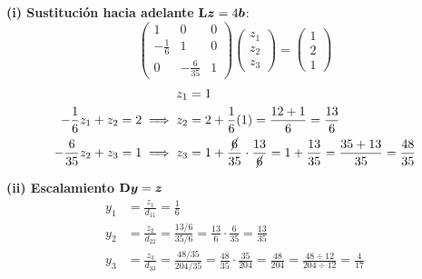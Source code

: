 \textbf{(i) Sustitución hacia adelante} $\mathbf{L}\bm{z} = 4\bm{b}$:
\[
  \begin{pmatrix} 1 & 0 & 0\\ -\frac16 & 1 & 0\\ 0 & -\frac{6}{35} & 1 \end{pmatrix}
  \begin{pmatrix} z_1\\ z_2\\ z_3 \end{pmatrix} = \begin{pmatrix} 1\\ 2\\ 1 \end{pmatrix}
\]
\begin{align*}
  z_1 &= 1\\
  -\frac16 z_1 + z_2 = 2 \;\Longrightarrow\; z_2 &= 2 + \frac16(1) = \frac{12 + 1}{6} = \frac{13}{6}\\
  -\frac{6}{35} z_2 + z_3 = 1 \;\Longrightarrow\; z_3 &= 1 + \frac{\cancel{6}}{35}\cdot\frac{13}{\cancel{6}}
     = 1 + \frac{13}{35} = \frac{35 + 13}{35} = \frac{48}{35}
\end{align*}

\textbf{(ii) Escalamiento} $\mathbf{D}\bm{y} = \bm{z}$
\begin{align*}
  y_1 &= \frac{z_1}{d_{11}} = \frac{1}{6}\\
  y_2 &= \frac{z_2}{d_{22}} = \frac{13/6}{35/6} = \frac{13}{{6}}\cdot\frac{{6}}{35} = \frac{13}{35}\\
  y_3 &= \frac{z_3}{d_{33}} = \frac{48/35}{204/35} = \frac{48}{{35}}\cdot\frac{{35}}{204}
       = \frac{48}{204} = \frac{48 \div 12}{204 \div 12} = \frac{4}{17}
\end{align*}

